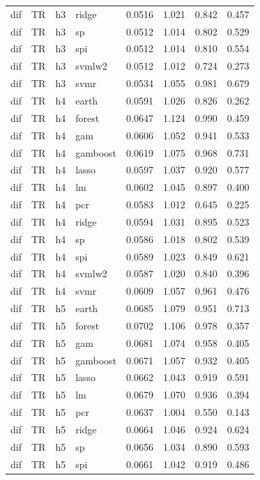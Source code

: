 \begin{ThreePartTable}
\begin{longtable}[t]{llclcccc}
dif & TR & h3 & ridge & 0.0516 & 1.021 & 0.842 & 0.457\\
dif & TR & h3 & sp & 0.0512 & 1.014 & 0.802 & 0.529\\
dif & TR & h3 & spi & 0.0512 & 1.014 & 0.810 & 0.554\\
dif & TR & h3 & svmlw2 & 0.0512 & 1.012 & 0.724 & 0.273\\
dif & TR & h3 & svmr & 0.0534 & 1.055 & 0.981 & 0.679\\
\addlinespace
dif & TR & h4 & earth & 0.0591 & 1.026 & 0.826 & 0.262\\
dif & TR & h4 & forest & 0.0647 & 1.124 & 0.990 & 0.459\\
dif & TR & h4 & gam & 0.0606 & 1.052 & 0.941 & 0.533\\
dif & TR & h4 & gamboost & 0.0619 & 1.075 & 0.968 & 0.731\\
dif & TR & h4 & lasso & 0.0597 & 1.037 & 0.920 & 0.577\\
dif & TR & h4 & lm & 0.0602 & 1.045 & 0.897 & 0.400\\
dif & TR & h4 & pcr & 0.0583 & 1.012 & 0.645 & 0.225\\
dif & TR & h4 & ridge & 0.0594 & 1.031 & 0.895 & 0.523\\
dif & TR & h4 & sp & 0.0586 & 1.018 & 0.802 & 0.539\\
dif & TR & h4 & spi & 0.0589 & 1.023 & 0.849 & 0.621\\
dif & TR & h4 & svmlw2 & 0.0587 & 1.020 & 0.840 & 0.396\\
dif & TR & h4 & svmr & 0.0609 & 1.057 & 0.961 & 0.476\\
\addlinespace
dif & TR & h5 & earth & 0.0685 & 1.079 & 0.951 & 0.713\\
dif & TR & h5 & forest & 0.0702 & 1.106 & 0.978 & 0.357\\
dif & TR & h5 & gam & 0.0681 & 1.074 & 0.958 & 0.405\\
dif & TR & h5 & gamboost & 0.0671 & 1.057 & 0.932 & 0.405\\
dif & TR & h5 & lasso & 0.0662 & 1.043 & 0.919 & 0.591\\
dif & TR & h5 & lm & 0.0679 & 1.070 & 0.936 & 0.394\\
dif & TR & h5 & pcr & 0.0637 & 1.004 & 0.550 & 0.143\\
dif & TR & h5 & ridge & 0.0664 & 1.046 & 0.924 & 0.624\\
dif & TR & h5 & sp & 0.0656 & 1.034 & 0.890 & 0.593\\
dif & TR & h5 & spi & 0.0661 & 1.042 & 0.919 & 0.486\\

\end{longtable}
\end{ThreePartTable}
